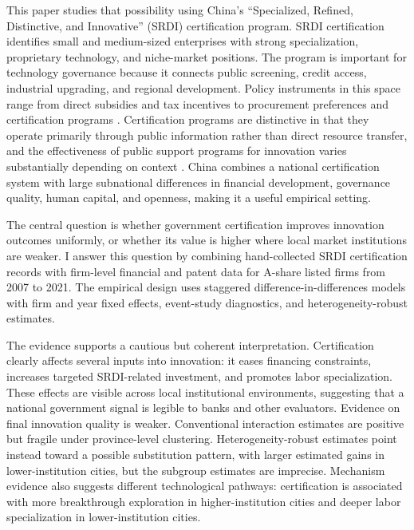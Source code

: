 \documentclass[12pt]{article}
\begin{document}
This paper studies that possibility using China's ``Specialized, Refined, Distinctive, and Innovative'' (SRDI) certification program. SRDI certification identifies small and medium-sized enterprises with strong specialization, proprietary technology, and niche-market positions. The program is important for technology governance because it connects public screening, credit access, industrial upgrading, and regional development. Policy instruments in this space range from direct subsidies and tax incentives to procurement preferences and certification programs \citep{rodrik2004,aghion2015}. Certification programs are distinctive in that they operate primarily through public information rather than direct resource transfer, and the effectiveness of public support programs for innovation varies substantially depending on context \citep{lerner2009}. China combines a national certification system with large subnational differences in financial development, governance quality, human capital, and openness, making it a useful empirical setting.

The central question is whether government certification improves innovation outcomes uniformly, or whether its value is higher where local market institutions are weaker. I answer this question by combining hand-collected SRDI certification records with firm-level financial and patent data for A-share listed firms from 2007 to 2021. The empirical design uses staggered difference-in-differences models with firm and year fixed effects, event-study diagnostics, and heterogeneity-robust estimates.

The evidence supports a cautious but coherent interpretation. Certification clearly affects several inputs into innovation: it eases financing constraints, increases targeted SRDI-related investment, and promotes labor specialization. These effects are visible across local institutional environments, suggesting that a national government signal is legible to banks and other evaluators. Evidence on final innovation quality is weaker. Conventional interaction estimates are positive but fragile under province-level clustering. Heterogeneity-robust estimates point instead toward a possible substitution pattern, with larger estimated gains in lower-institution cities, but the subgroup estimates are imprecise. Mechanism evidence also suggests different technological pathways: certification is associated with more breakthrough exploration in higher-institution cities and deeper labor specialization in lower-institution cities.
\end{document}
